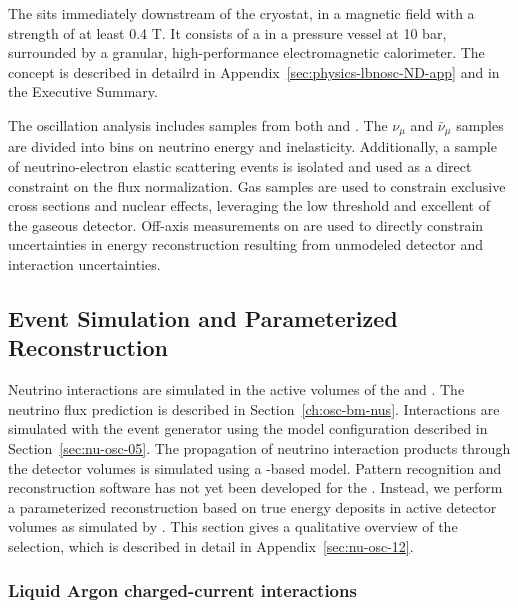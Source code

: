The  sits immediately downstream of the  cryostat, in a magnetic field with a strength of at least 0.4 T. It consists of a  %
in a pressure vessel at 10 bar, surrounded by a granular, high-performance electromagnetic calorimeter. The  concept is described in detailrd in Appendix~\ref{sec:physics-lbnosc-ND-app} and in the Executive Summary.

The oscillation analysis includes  samples from both  and . %
The  $\nu_{\mu}$ and $\bar{\nu}_{\mu}$  samples are divided into \twod bins on neutrino energy and inelasticity. Additionally, a sample of neutrino-electron elastic scattering events is isolated and used as a direct constraint on the flux normalization. Gas  samples are used to constrain exclusive cross sections and nuclear effects, leveraging the low threshold and excellent  of the gaseous detector. Off-axis measurements on  are used to directly constrain uncertainties in energy reconstruction resulting from unmodeled detector and interaction uncertainties.

\subsection{Event Simulation and Parameterized Reconstruction}
\label{sec:ndsimreco}

Neutrino interactions are simulated in the active volumes of the  and  . The neutrino flux prediction is described in Section~\ref{ch:osc-bm-nus}. Interactions are simulated with the  event generator using the model configuration described in Section~\ref{sec:nu-osc-05}. The propagation of neutrino interaction products through the detector volumes is simulated using a -based model. Pattern recognition and reconstruction software has not yet been developed for the . Instead, we perform a parameterized reconstruction based on true energy deposits in active detector volumes as simulated by . This section gives a qualitative overview of the selection, which is described in detail in Appendix~\ref{sec:nu-osc-12}.

\subsubsection{Liquid Argon charged-current interactions}

